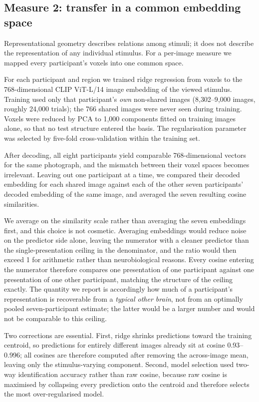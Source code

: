 \documentclass[11pt,a4paper]{article}
\begin{document}
\subsection{Measure 2: transfer in a common embedding space}

Representational geometry describes relations among stimuli; it does not describe
the representation of any individual stimulus. For a per-image measure we mapped
every participant's voxels into one common space.

For each participant and region we trained ridge regression
\citep{naselaris2011} from voxels to the 768-dimensional CLIP ViT-L/14 image
embedding \citep{radford2021} of the viewed stimulus. Training used only that
participant's \emph{own} non-shared images (8{,}302--9{,}000 images, roughly
24{,}000 trials); the 766 shared images were never seen during training. Voxels
were reduced by PCA to 1{,}000 components fitted on training images alone, so
that no test structure entered the basis. The regularisation parameter was
selected by five-fold cross-validation within the training set.

After decoding, all eight participants yield comparable 768-dimensional vectors
for the same photograph, and the mismatch between their voxel spaces becomes
irrelevant. Leaving out one participant at a time, we compared their decoded
embedding for each shared image against each of the other seven participants'
decoded embedding of the same image, and averaged the seven resulting cosine
similarities.

We average on the similarity scale rather than averaging the seven embeddings
first, and this choice is not cosmetic. Averaging embeddings would reduce noise
on the predictor side alone, leaving the numerator with a cleaner predictor than
the single-presentation ceiling in the denominator, and the ratio would then
exceed 1 for arithmetic rather than neurobiological reasons. Every cosine
entering the numerator therefore compares one presentation of one participant
against one presentation of one other participant, matching the structure of the
ceiling exactly. The quantity we report is accordingly how much of a
participant's representation is recoverable from a \emph{typical other brain},
not from an optimally pooled seven-participant estimate; the latter would be a
larger number and would not be comparable to this ceiling.

Two corrections are essential. First, ridge shrinks predictions toward the
training centroid, so predictions for entirely different images already sit at
cosine 0.93--0.996; all cosines are therefore computed after removing the
across-image mean, leaving only the stimulus-varying component. Second, model
selection used two-way identification accuracy rather than raw cosine, because
raw cosine is maximised by collapsing every prediction onto the centroid and
therefore selects the most over-regularised model.
\end{document}
